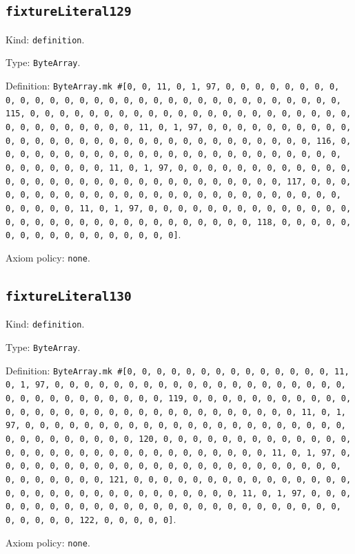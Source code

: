 \documentclass[11pt]{article}
\begin{document}
\subsection*{\texttt{fixtureLiteral129}}
\noindent Kind: \texttt{definition}.\par
\noindent Type: \texttt{ByteArray}.\par
\noindent Definition: \texttt{ByteArray.mk \#[0, 0, 11, 0, 1, 97, 0, 0, 0, 0, 0, 0, 0, 0, 0, 0, 0, 0, 0, 0, 0, 0, 0, 0, 0, 0, 0, 0, 0, 0, 0, 0, 0, 0, 0, 0, 0, 115, 0, 0, 0, 0, 0, 0, 0, 0, 0, 0, 0, 0, 0, 0, 0, 0, 0, 0, 0, 0, 0, 0, 0, 0, 0, 0, 0, 0, 0, 0, 0, 11, 0, 1, 97, 0, 0, 0, 0, 0, 0, 0, 0, 0, 0, 0, 0, 0, 0, 0, 0, 0, 0, 0, 0, 0, 0, 0, 0, 0, 0, 0, 0, 0, 0, 0, 116, 0, 0, 0, 0, 0, 0, 0, 0, 0, 0, 0, 0, 0, 0, 0, 0, 0, 0, 0, 0, 0, 0, 0, 0, 0, 0, 0, 0, 0, 0, 0, 11, 0, 1, 97, 0, 0, 0, 0, 0, 0, 0, 0, 0, 0, 0, 0, 0, 0, 0, 0, 0, 0, 0, 0, 0, 0, 0, 0, 0, 0, 0, 0, 0, 0, 0, 117, 0, 0, 0, 0, 0, 0, 0, 0, 0, 0, 0, 0, 0, 0, 0, 0, 0, 0, 0, 0, 0, 0, 0, 0, 0, 0, 0, 0, 0, 0, 0, 11, 0, 1, 97, 0, 0, 0, 0, 0, 0, 0, 0, 0, 0, 0, 0, 0, 0, 0, 0, 0, 0, 0, 0, 0, 0, 0, 0, 0, 0, 0, 0, 0, 0, 0, 118, 0, 0, 0, 0, 0, 0, 0, 0, 0, 0, 0, 0, 0, 0, 0, 0, 0]}.\par
\noindent Axiom policy: \texttt{none}.\par
\subsection*{\texttt{fixtureLiteral130}}
\noindent Kind: \texttt{definition}.\par
\noindent Type: \texttt{ByteArray}.\par
\noindent Definition: \texttt{ByteArray.mk \#[0, 0, 0, 0, 0, 0, 0, 0, 0, 0, 0, 0, 0, 0, 11, 0, 1, 97, 0, 0, 0, 0, 0, 0, 0, 0, 0, 0, 0, 0, 0, 0, 0, 0, 0, 0, 0, 0, 0, 0, 0, 0, 0, 0, 0, 0, 0, 0, 0, 119, 0, 0, 0, 0, 0, 0, 0, 0, 0, 0, 0, 0, 0, 0, 0, 0, 0, 0, 0, 0, 0, 0, 0, 0, 0, 0, 0, 0, 0, 0, 0, 11, 0, 1, 97, 0, 0, 0, 0, 0, 0, 0, 0, 0, 0, 0, 0, 0, 0, 0, 0, 0, 0, 0, 0, 0, 0, 0, 0, 0, 0, 0, 0, 0, 0, 0, 120, 0, 0, 0, 0, 0, 0, 0, 0, 0, 0, 0, 0, 0, 0, 0, 0, 0, 0, 0, 0, 0, 0, 0, 0, 0, 0, 0, 0, 0, 0, 0, 11, 0, 1, 97, 0, 0, 0, 0, 0, 0, 0, 0, 0, 0, 0, 0, 0, 0, 0, 0, 0, 0, 0, 0, 0, 0, 0, 0, 0, 0, 0, 0, 0, 0, 0, 121, 0, 0, 0, 0, 0, 0, 0, 0, 0, 0, 0, 0, 0, 0, 0, 0, 0, 0, 0, 0, 0, 0, 0, 0, 0, 0, 0, 0, 0, 0, 0, 11, 0, 1, 97, 0, 0, 0, 0, 0, 0, 0, 0, 0, 0, 0, 0, 0, 0, 0, 0, 0, 0, 0, 0, 0, 0, 0, 0, 0, 0, 0, 0, 0, 0, 0, 122, 0, 0, 0, 0, 0]}.\par
\noindent Axiom policy: \texttt{none}.\par
\end{document}
